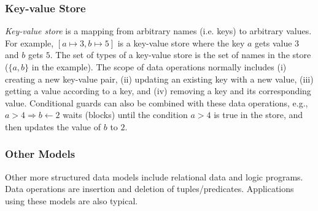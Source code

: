 \subsubsection*{Key-value Store}

{\em Key-value store} is a mapping from arbitrary names
(i.e. keys) to arbitrary values.
For example, $[a\mapsto 3, b\mapsto 5]$ is a key-value store
where the key $a$ gets value $3$ and $b$ gets $5$.
The set of types of a key-value store is the set of names in
the store ($\{a,b\}$ in the example). The scope of data operations normally
includes (i) creating a new key-value pair,
(ii) updating an existing key with a new value,
(iii) getting a value according to a key, and
(iv) removing a key and its corresponding value.
Conditional guards can also be combined with these data operations,
e.g., $a>4\Rightarrow b\gets 2$ waits (blocks) until
the condition $a>4$ is true in the store,
and then updates the value of $b$ to $2$.

\subsubsection*{Other Models}
Other more structured data models include relational data and logic programs.
Data operations are insertion and deletion of tuples/predicates. Applications
using these models are also typical.

%
%
